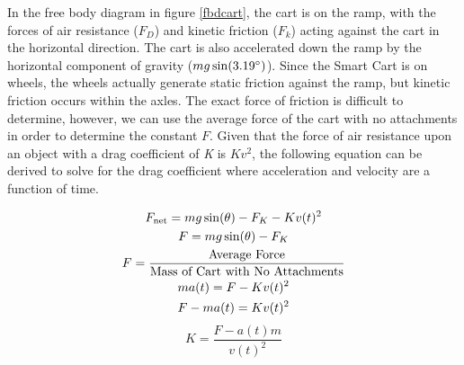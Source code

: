 In the free body diagram in figure \ref{fbdcart}, the cart is on the ramp, with the forces of air resistance ($F_{D}$) and kinetic friction ($F_{k}$) acting
against the cart in the horizontal direction. The cart is also accelerated down the ramp by the horizontal component of gravity ($mg\sin(3.19\degree)$).
Since the Smart Cart is on wheels, the wheels actually generate static friction against the ramp, but kinetic friction occurs within the axles. The exact
force of friction is difficult to determine, however, we can use the average force of the cart with no attachments in order to determine the constant $F$.
Given that the force of air resistance upon an object with a drag coefficient of \textit{K} is $Kv^2$, the following equation can be derived to solve for the
drag coefficient where acceleration and velocity are a function of time. 

\begin{gather*}
  F_{\textup{net}} = mg\sin(\theta) - F_{K} - Kv(t)^2\\
  F = mg\sin(\theta) - F_{K} \\
  F = \frac{\textup{Average Force}}{\textup{Mass of Cart with No Attachments}} \\
  ma(t) = F - Kv(t)^2\\
  F - ma(t) = Kv(t)^2
\end{gather*}
\begin{equation}
  K = \frac{F-a(t)m}{v(t)^2}
  \label{Eq:K}
\end{equation}


